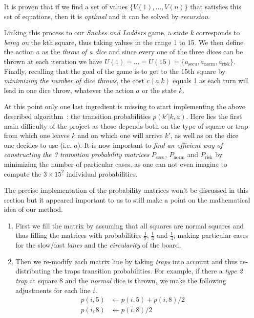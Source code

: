 It is proven that if we find a set of values $\{V(1), \dots, V(n)\}$
that satisfies this set of equations, then it is \emph{optimal}
and it can be solved by \emph{recursion}.

Linking this process to our \textit{Snakes and Ladders} game,
a state $k$ corresponds to \emph{being on} the kth square,
thus taking values in the range 1 to 15.
We then define the action $a$ as the \emph{throw of a dice}
and since every one of the three dices can be thrown at each
iteration we have $U(1) = \dots = U(15) = \{a_{\text{secu}},
a_{\text{norm}}, a_{\text{risk}}\}$.
Finally, recalling that the goal of the game is to get to
the 15th square by \emph{minimizing the number of dice throws},
the cost $c(a|k)$ equals 1 as each turn will lead in one dice
throw, whatever the action $a$ or the state $k$. 

At this point only one last ingredient is missing to start implementing
the above described algorithm~: the transition probabilities $p(k'|k,a)$.
Here lies the first main difficulty of the project as those depends
both on the type of square or trap from which one leaves $k$ and
on which one will arrive $k'$, as well as on the dice one
decides to use (i.e. $a$).
It is now important to \emph{find an efficient way of constructing
the 3 transition probability matrices} $P_{\text{secu}}$, $P_{\text{norm}}$
and $P_{\text{risk}}$ by minimizing the number of particular cases,
as one can not even imagine to compute the $3\times 15^2$ individual probabilities.

The precise implementation of the probability matrices won't be
discussed in this section but it appeared important to us
to still make a point on the mathematical idea of our method.
\begin{enumerate}
  \item First we fill the matrix by assuming that
  all squares are normal squares and thus filling the matrices
  with probabilities $\frac{1}{2}$, $\frac{1}{3}$ and $\frac{1}{4}$,
  making particular cases for the slow/fast \emph{lanes}
  and the \emph{circularity} of the board.
  \item Then we re-modify each matrix line by taking \emph{traps} into account
  and thus re-distributing the traps transition probabilities.
  For example, if there a \emph{type 2 trap} at square 8 
  and the \emph{normal} dice is thrown, we make the following adjustments
  for each line $i$.
  \begin{align*}
    p(i,5) &\leftarrow p(i,5) + p(i,8)/2 \\
     p(i,8) &\leftarrow p(i,8)/2
  \end{align*}
\end{enumerate}

